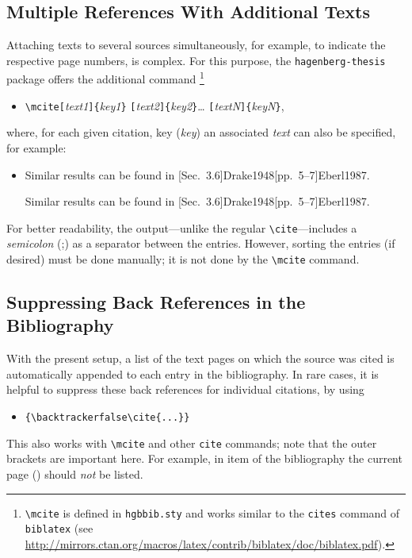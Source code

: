 \subsection{Multiple References With Additional Texts}

Attaching texts to several sources simultaneously, for example, to indicate the
respective page numbers, is complex. For this purpose, the
\texttt{hagenberg-thesis} package offers the additional command%
\footnote{\texttt{\textbackslash mcite} is defined in \texttt{hgbbib.sty} and
works similar to the \texttt{{\bs}cites} command of \texttt{biblatex}
(see \url{http://mirrors.ctan.org/macros/latex/contrib/biblatex/doc/biblatex.pdf}).}
%
\begin{itemize}
\item[]
\verb!\mcite[!\textit{text1}\verb!]{!\textit{key1}\verb!}!%
      \verb![!\textit{text2}\verb!]{!\textit{key2}\verb!}!\ldots%
			\verb![!\textit{textN}\verb!]{!\textit{keyN}\verb!}!,
\end{itemize}
%
where, for each given citation, key (\textit{key}) an associated \textit{text} can
also be specified, for example:
%
\begin{itemize}
    \item Similar results can be found in 
    [Sec.~3.6]{Drake1948}[pp.~5--7]{Eberl1987}.
\begin{LaTeXCode}[numbers=none]
Similar results can be found in 
[Sec.~3.6]{Drake1948}[pp.~5--7]{Eberl1987}.
\end{LaTeXCode}
\end{itemize}
%
For better readability, the output---unlike the regular
\texttt{\textbackslash cite}---includes a \emph{semicolon} (;) as a separator
between the entries. However, sorting the entries (if desired) must be done
manually; it is not done by the \texttt{\textbackslash mcite} command.


\subsection{Suppressing Back References in the Bibliography}

With the present setup, a list of the text pages on which the source was cited
is automatically appended to each entry in the bibliography. In rare cases, it
is helpful to suppress these back references for individual citations, by using
%
\begin{itemize}
    \item[] \verb!{\backtrackerfalse\cite{...}}!
\end{itemize}
%
This also works with \verb!\mcite! and other \verb!cite! commands; note that 
the outer brackets are important here. For example, in item
{\backtrackerfalse\parencite{Bezos2023}} of the bibliography 
the current page (\the\value{page}) should \emph{not} be listed.


